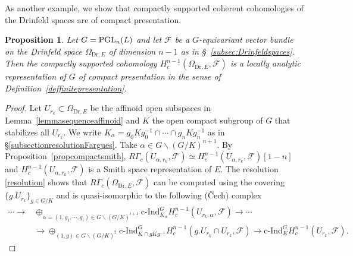 \documentclass[a4paper,10pt]{amsart}
\theoremstyle{remark}
\theoremstyle{definition}
\theoremstyle{plain}
\newtheorem{proposition}[theorem]{Proposition}
\numberwithin{equation}{section}
\newcommand{\calF}{{\mathcal F}}
\newcommand{\PGL}{{\rm PGL}}
\newcommand{\cInd}{\mathrm{c\text{-}Ind}}
\begin{document}
As another example, we show that compactly supported coherent cohomologies of the Drinfeld spaces are of compact presentation. 
\begin{proposition}\label{propositionDrinfeldcompactpresentation}
	Let $G=\PGL_{n}(L)$ and let $\calF$ be a $G$-equivariant vector bundle on the Drinfeld space $\Omega_{\mathrm{Dr},E}$ of dimension $n-1$ as in \S~\ref{subsec:Drinfeldspaces}. Then the compactly supported cohomology $H^{n-1}_c(\Omega_{\mathrm{Dr},E},\calF)$ is a locally analytic representation of $G$ of compact presentation in the sense of Definition~\ref{deffinitepresentation}.
\end{proposition}
\begin{proof}
	Let $U_{r_k}\subset \Omega_{\mathrm{Dr},E}$ be the affinoid open subspaces in Lemma~\ref{lemmasequenceaffinoid} and $K$ the open compact subgroup of $G$ that stabilizes all $U_{r_k}$. We write $K_{\alpha}=g_{0}Kg_0^{-1}\cap\cdots \cap g_{n}Kg_n^{-1}$ as in \S\ref{subsectionresolutionFargues}. Take $\alpha\in G\backslash(G/K)^{n+1}$. By Proposition~\ref{propcompactsmith}, $R\Gamma_c(U_{\alpha,r_k},\calF)\simeq H_c^{n-1}(U_{\alpha,r_k},\calF)[1-n]$ and $H_c^{n-1}(U_{\alpha,r_k},\calF)$ is a Smith space representation of $E$. The resolution \eqref{resolution} shows that $R\Gamma_c(\Omega_{\mathrm{Dr},E},\calF)$ can be computed using the covering $\{g.U_{r_k}\}_{g\in G/K}$ and is quasi-isomorphic to the following (\v{C}ech) complex 
	\begin{equation}\label{equationresolutionrkinfinite}
		\begin{aligned}
			\cdots\rightarrow &\oplus_{\alpha=(1,g_1,\cdots,g_i)\in G\backslash (G/K)^{i+1}}\cInd_{K_{\alpha}}^G H_c^{n-1}(U_{r_k,\alpha},\calF)\rightarrow\cdots \\
			&\rightarrow \oplus_{(1,g)\in G\backslash (G/K)^2}\cInd_{K\cap g Kg^{-1}}^G H_c^{n-1}(g.U_{r_k}\cap U_{r_k},\calF)\rightarrow \cInd_{K}^G H_c^{n-1}(U_{r_k},\calF).
			\end{aligned}	
	\end{equation}


\end{proof}
\end{document}
